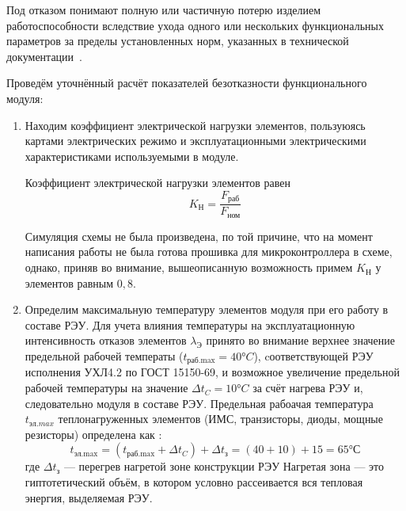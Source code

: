 Под отказом понимают полную или частичную потерю изделием
работоспособности вследствие ухода одного или нескольких
функциональных параметров за пределы установленных норм, указанных в
технической документации~\cite{Borovikov2010}.

Проведём уточнённый расчёт показателей безотказности функционального модуля:
\begin{enumerate}
\item Находим коэффициент электрической нагрузки элементов, пользуюясь
картами электрических режимо и эксплуатационными электрическими
характеристиками используемыми в модуле.

Коэффициент электрической нагрузки элементов равен
\begin{equation}
  K_{\text{Н}} = \frac{F_{\text{раб}}}{F_{\text{ном}}}
\end{equation}



Симуляция схемы не была произведена, по той причине, что на момент
написания работы не была готова прошивка для микроконтроллера в схеме,
однако, приняв во внимание,  вышеописанную возможность примем
$K_{\text{Н}}$ у элементов равным $0,8$.
\item Определим максимальную температуру элементов модуля при его
  работу в составе РЭУ.
  Для учета влияния температуры на эксплуатационную интенсивность
  отказов элементов  $\lambda_{\text{Э}}$ принято во внимание
  верхнее значение предельной рабочей температы
  ($t_{\text{раб.max}}= 40°C$), cоответствующей РЭУ
  исполнения УХЛ4.2 по ГОСТ 15150-69, и возможное увеличение предельной рабочей температуры на значение
  $\Delta t_C = 10°C$ за счёт нагрева РЭУ и, следовательно модуля в составе РЭУ.
  Предельная рабоачая температура $t_{эл.max}$ теплонагруженных
  элементов (ИМС, транзисторы, диоды, мощные резисторы) определена как \cite{Borovikov2010}:
  \begin{equation}
    t_{\text{эл.max}} = (t_{\text{раб.max}} + \Delta t_C) + \Delta t_{\text{з}} = (40 + 10) +15 = 65°С
  \end{equation}
  где $\Delta t_{\text{з}}$ — перегрев нагретой зоне конструкции РЭУ
  Нагретая зона — это гиптотетический объём, в котором условно
  рассеивается вся тепловая энергия, выделяемая РЭУ.


\end{enumerate}
